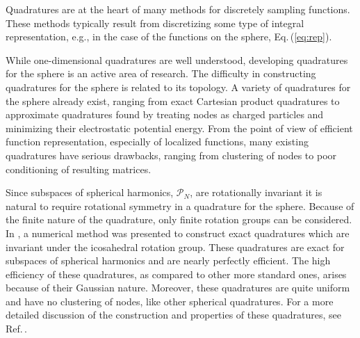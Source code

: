 \documentclass[landscape,a0b,final]{a0poster}
\newcommand{\HH}{{\mathcal P}}
\newenvironment{poster}{
  \begin{center}
  \begin{minipage}[c]{0.98\textwidth}
}{
  \end{minipage} 
  \end{center}
}
\begin{document}
\begin{poster}
\begin{multicols}{3}
Quadratures are at the heart of many methods for discretely sampling functions. These methods typically result from 
discretizing some type of integral representation, e.g., in the case of the functions on the sphere, Eq.\,(\ref{eq:rep}). 

\hspace{1cm}While one-dimensional quadratures are well understood, developing quadratures for the sphere is an active area of research. The difficulty in constructing quadratures for the sphere is related to its topology. A variety of quadratures for the sphere already exist, ranging from exact Cartesian product quadratures to approximate quadratures found by treating nodes as charged particles and minimizing their electrostatic potential energy. From the point of view of efficient function representation, especially of localized functions, many existing quadratures have serious drawbacks, ranging from clustering of nodes to poor conditioning of resulting matrices.

\hspace{1cm}Since subspaces of spherical harmonics, $\HH_{N}$, are rotationally invariant it is natural to require rotational symmetry in a quadrature for the sphere. Because of the finite nature of the quadrature, only finite rotation groups can be considered. In \cite{AHR-BEY-2009}, a numerical method was presented to construct exact quadratures which are invariant under the icosahedral rotation group. These quadratures are exact for subspaces of spherical harmonics and are nearly perfectly efficient. The high efficiency of these quadratures, as compared to other more standard ones, arises because of their Gaussian nature. Moreover, these quadratures are quite uniform and have no clustering of nodes, like other spherical quadratures. For a more detailed discussion of the construction and properties of these quadratures, see Ref.\,\cite{AHR-BEY-2009}. 


\end{multicols}
\end{poster}
\end{document}
